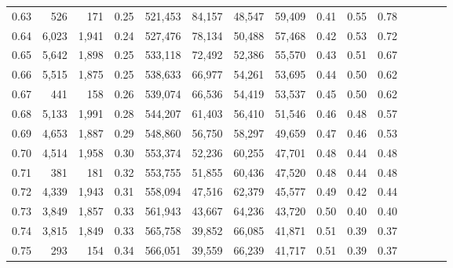 \begin{tabular}{rrrcrrrrrrrrrrr}
0.63 &     526 &     171 &                                       0.25 &  521,453 &   84,157 &   48,547 &   59,409 &  0.41 &  0.55 &                         0.78 \\
0.64 &   6,023 &   1,941 &                                       0.24 &  527,476 &   78,134 &   50,488 &   57,468 &  0.42 &  0.53 &                         0.72 \\
0.65 &   5,642 &   1,898 &                                       0.25 &  533,118 &   72,492 &   52,386 &   55,570 &  0.43 &  0.51 &                         0.67 \\
0.66 &   5,515 &   1,875 &                                       0.25 &  538,633 &   66,977 &   54,261 &   53,695 &  0.44 &  0.50 &                         0.62 \\
0.67 &     441 &     158 &                                       0.26 &  539,074 &   66,536 &   54,419 &   53,537 &  0.45 &  0.50 &                         0.62 \\
0.68 &   5,133 &   1,991 &                                       0.28 &  544,207 &   61,403 &   56,410 &   51,546 &  0.46 &  0.48 &                         0.57 \\
0.69 &   4,653 &   1,887 &                                       0.29 &  548,860 &   56,750 &   58,297 &   49,659 &  0.47 &  0.46 &                         0.53 \\
0.70 &   4,514 &   1,958 &                                       0.30 &  553,374 &   52,236 &   60,255 &   47,701 &  0.48 &  0.44 &                         0.48 \\
0.71 &     381 &     181 &                                       0.32 &  553,755 &   51,855 &   60,436 &   47,520 &  0.48 &  0.44 &                         0.48 \\
0.72 &   4,339 &   1,943 &                                       0.31 &  558,094 &   47,516 &   62,379 &   45,577 &  0.49 &  0.42 &                         0.44 \\
0.73 &   3,849 &   1,857 &                                       0.33 &  561,943 &   43,667 &   64,236 &   43,720 &  0.50 &  0.40 &                         0.40 \\
0.74 &   3,815 &   1,849 &                                       0.33 &  565,758 &   39,852 &   66,085 &   41,871 &  0.51 &  0.39 &                         0.37 \\
0.75 &     293 &     154 &                                       0.34 &  566,051 &   39,559 &   66,239 &   41,717 &  0.51 &  0.39 &                         0.37 \\

\end{tabular}
